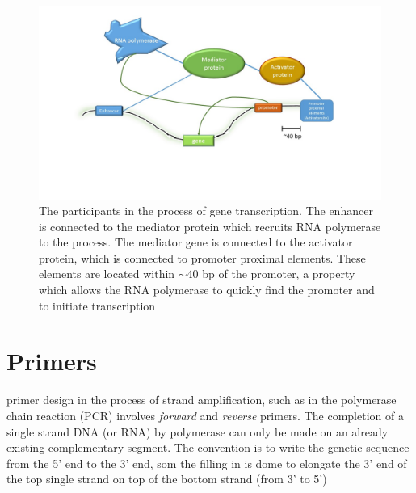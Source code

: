 \documentclass[12pt]{paper}
\begin{document}
\begin{figure}[H]
\includegraphics[scale=0.5]{mechanismOfGeneTransciption}
\caption{The participants in the process of gene transcription. The enhancer is connected to the mediator protein which recruits RNA polymerase to the process. The mediator gene is connected to the activator protein, which is connected to promoter proximal elements. These elements are located within $\sim$40 bp of the promoter, a property which allows the RNA polymerase to quickly find the promoter and to initiate transcription}
\label{mechanismOfGeneTranscription}
\end{figure}

\section{Primers}\label{section_primers}
primer design in the process of strand amplification, such as in the polymerase chain reaction (PCR) involves \textit{forward} and \textit{reverse} primers. The completion of a single strand DNA (or RNA) by polymerase can only be made on an already existing complementary segment. The convention is to write the genetic sequence from the 5' end to the 3' end, som the filling in is dome to elongate the 3' end of the top single strand on top of the bottom strand (from 3' to 5')

\end{document}
